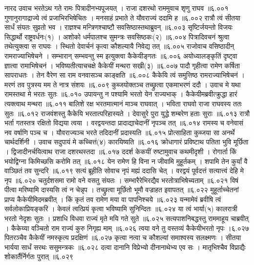 नारद उवाच
भरतेऽथ गते रामः पित्रादीनभ्यपूजयत् ।
राजा दशरथो राममुवाच शृणु राघव ॥६.००१
गुणानुरागाद्राज्ये त्वं प्रजाभिरभिषेचितः ।
मनसाहं प्रभाते ते यौवराज्यं ददामि ह ॥६.००२
रात्रौ त्वं सीतया सार्धं संयतः सुव्रतो भव ।
राज्ञश्च मन्त्रिणश्चाष्टौ सवसिष्ठास्तथाब्रुवन् ॥६.००३
सृष्टिर्जयन्तो विजयः सिद्धार्थो राष्ट्रवर्धनः(१) ।
अशोको धर्मपालश्च सुमन्त्रः सवसिष्ठकः(२) ॥६.००४
पित्रादिवचनं श्रुत्वा तथेत्युक्त्वा स राघवः ।
स्थितो देवार्चनं कृत्वा कौशल्यायै निवेद्य तत् ॥६.००५
राजोवाच वसिष्ठादीन् रामराज्याभिषेचने ।
सम्भारान् सम्भवन्तु स्म इत्युक्त्वा कैकेयीङ्गतः ॥६.००६
अयोध्यालङ्कृतिं दृष्ट्वा ज्ञात्वा रामाभिषेचनं ।
भविष्यतीत्याचचक्षे कैकेयीं मन्थरा सखी(३) ॥६.००७
पादौ गृहीत्वा रामेण कर्षिता सापराधतः ।
तेन वैरेण सा राम वनवासञ्च काङ्क्षति ॥६.००८
कैकेयि त्वं समुत्तिष्ठ रामराज्याभिषेचनं ।
मरणं तव पुत्रस्य मम ते नात्र संशयः ॥६.००९
कुब्जयोक्तञ्च तच्छ्रुत्वा एकमाभरणं ददौ ।
उवाच मे यथा रामस्तथा मे भरतः सुतः ॥६.०१०
उपायन्तु न पश्यामि भरतो येन राज्यभाक् ।
कैकेयीमब्रवीत्क्रुद्धा हारं त्यक्त्वाथ मन्थरा ॥६.०११
बालिशे रक्ष भरतमात्मानं माञ्च राघवात् ।
भविता राघवो राजा राघवस्य ततः सुतः ॥६.०१२
राजवंशस्तु कैकेयि भरतात्परिहास्यते ।
देवासुरे पुरा युद्धे शम्बरेण हताः सुराः ॥६.०१३
रात्रौ भर्ता गतस्तत्र रक्षितो विद्यया त्वया ।
वरद्वयन्तदा प्रादाद्याचेदानीं नृपञ्च तत् ॥६.०१४
रामस्य च वनेवासं नव वर्षाणि पञ्च च ।
यौवराज्यञ्च भरते तदिदानीं प्रदास्यति ॥६.०१५
प्रोत्साहिता कुब्जया सा अनर्थे चार्थदर्शिनी ।
उवाच सदुपायं मे कच्चित्तं(४) कारयिष्यति ॥६.०१६
क्रोधागारं प्रविष्टाथ पतिता भुवि मूर्छिता ।
द्विजादीनर्चयित्वाथ राजा दशरथस्तदा ॥६.०१७
ददर्श केकयीं रुष्टामुवाच कथमीदृशी ।
रोगार्ता किं भयोद्विग्ना किमिच्छसि करोमि तत् ॥६.०१८
येन रामेण हि विना न जीवामि मुहूर्तकम् ।
शपामि तेन कुर्यां वै वाञ्छितं तव सुन्दरि ॥६.०१९
सत्यं ब्रूहीति सोवाच नृपं मह्यं ददासि चेत् ।
वरद्वयं पूर्वदत्तं सत्यात्त्वं देहि मे नृप ॥६.०२०
चतुर्दशसमा रामो वने वसतु संयतः ।
सम्भारैरेभिरद्यैव भरतोत्राभिषेच्यताम् ॥६.०२१
विषं पीत्वा मरिष्यामि दास्यसि त्वं न चेन्नृप ।
तच्छ्रुत्वा मूर्छितो भूमौ वज्राहत इवापतत् ॥६.०२२
मुहूर्ताच्चेतनां प्राप्य कैकेयीमिदमब्रवीत् ।
किं कृतं तव रामेण मया वा पापनिश्चये ॥६.०२३
यन्मामेवं ब्रवीषि त्वं सर्वलोकाप्रियङ्करि ।
केवलं त्वत्प्रियं कृत्वा भविष्यामि सुनिन्दितः ॥६.०२४
या त्वं भार्या(५) कालरात्री भरतो नेदृशः सुतः ।
प्रशाधि विधवा राज्यं मृते मयि गते सुते ॥६.०२५
सत्यपाशनिबद्धस्तु राममाहूय चाब्रवीत् ।
कैकेय्या वञ्चितो राम राज्यं कुरु निगृह्य माम् ॥६.०२६
त्वया वने तु वस्तव्यं कैकेयीभरतो नृपः ।६.०२७
पितरञ्चैव कैकेयीं नमस्कृत्य प्रदक्षिणं ॥६.०२७
कृत्वा नत्वा च कौशल्यां समाश्वस्य सलक्ष्मणः ।
सीतया भार्यया सार्धं सरथः ससुमन्त्रकः ॥६.०२८
दत्वा दानानि विप्रेभ्यो दीनानाथेभ्य एव सः ।
मातृभिश्चैव विप्राद्यैः शोकार्तैर्निर्गतः पुरात् ॥६.०२९
